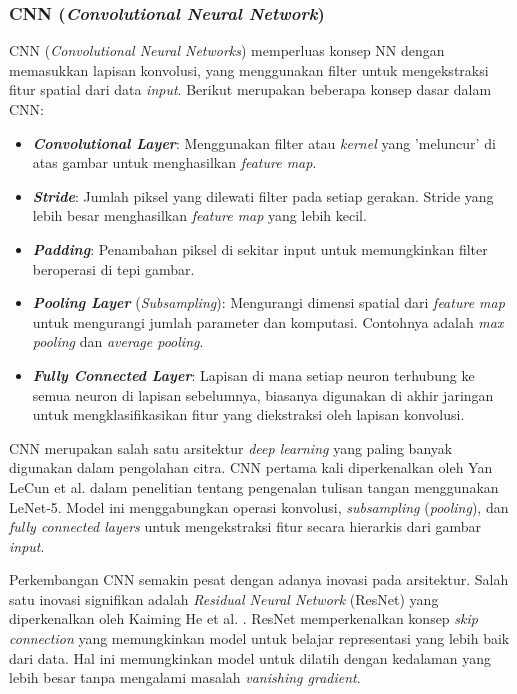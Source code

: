  \subsubsection{CNN (\emph{Convolutional Neural Network})}
 CNN (\emph{Convolutional Neural Networks}) memperluas konsep NN dengan memasukkan lapisan konvolusi, yang menggunakan filter untuk mengekstraksi fitur spatial dari data \emph{input}. Berikut merupakan beberapa konsep dasar dalam CNN:
 \begin{itemize}
   \item \textbf{\emph{Convolutional Layer}}: Menggunakan filter atau \emph{kernel} yang 'meluncur' di atas gambar untuk menghasilkan \emph{feature map}.
   \item \textbf{\emph{Stride}}: Jumlah piksel yang dilewati filter pada setiap gerakan. Stride yang lebih besar menghasilkan \emph{feature map} yang lebih kecil.
   \item \textbf{\emph{Padding}}: Penambahan piksel di sekitar input untuk memungkinkan filter beroperasi di tepi gambar.
   \item \textbf{\emph{Pooling Layer}} (\emph{Subsampling}): Mengurangi dimensi spatial dari \emph{feature map} untuk mengurangi jumlah parameter dan komputasi. Contohnya adalah \emph{max pooling} dan \emph{average pooling}.
   \item \textbf{\emph{Fully Connected Layer}}: Lapisan di mana setiap neuron terhubung ke semua neuron di lapisan sebelumnya, biasanya digunakan di akhir jaringan untuk mengklasifikasikan fitur yang diekstraksi oleh lapisan konvolusi.
 \end{itemize} 

 CNN merupakan salah satu arsitektur \emph{deep learning} yang paling banyak digunakan dalam pengolahan citra. CNN pertama kali diperkenalkan oleh Yan LeCun et al. \parencite*{yannlecun1998} dalam penelitian tentang pengenalan tulisan tangan menggunakan LeNet-5. Model ini menggabungkan operasi konvolusi, \emph{subsampling} (\emph{pooling}), dan \emph{fully connected layers} untuk mengekstraksi fitur secara hierarkis dari gambar \emph{input}.
 
Perkembangan CNN semakin pesat dengan adanya inovasi pada arsitektur. Salah satu inovasi signifikan adalah \emph{Residual Neural Network} (ResNet) yang diperkenalkan oleh Kaiming He et al. \parencite*{kaiminghe2015}. ResNet memperkenalkan konsep \emph{skip connection} yang memungkinkan model untuk belajar representasi yang lebih baik dari data. Hal ini memungkinkan model untuk dilatih dengan kedalaman yang lebih besar tanpa mengalami masalah \emph{vanishing gradient}.
 
